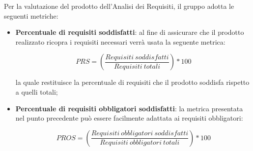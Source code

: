Per la valutazione del prodotto dell'Analisi dei Requisiti, il gruppo adotta le seguenti metriche:
\begin{itemize}
	\item \textbf{Percentuale di requisiti soddisfatti}: al fine di assicurare che il prodotto realizzato ricopra i requisiti necessari verrà usata la seguente metrica:
\begin{center}
\[PRS = \left(\frac{Requisiti\ soddisfatti}{Requisiti\ totali}\right)*100\]
\end{center}
la quale restituisce la percentuale di requisiti che il prodotto soddisfa rispetto a quelli totali;

	\item \textbf{Percentuale di requisiti obbligatori soddisfatti}: la metrica presentata nel punto precedente può essere facilmente adattata ai requisiti obbligatori:
\begin{center}
\[PROS=\left(\frac{Requisiti\ obbligatori\ soddisfatti}{Requisiti\ obbligatori\ totali}\right)*100\]
\end{center}
\end{itemize}


